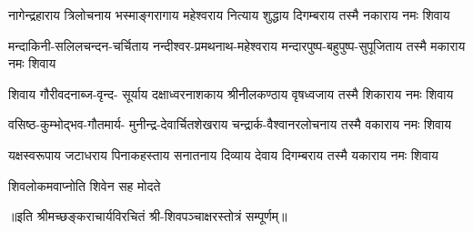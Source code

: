 

\fourlineindentedshloka
{नागेन्द्रहाराय त्रिलोचनाय}
{भस्माङ्गरागाय महेश्वराय}
{नित्याय शुद्धाय दिगम्बराय}
{तस्मै नकाराय नमः शिवाय}%

\fourlineindentedshloka
{मन्दाकिनी-सलिलचन्दन-चर्चिताय}
{नन्दीश्वर-प्रमथनाथ-महेश्वराय}
{मन्दारपुष्प-बहुपुष्प-सुपूजिताय}
{तस्मै मकाराय नमः शिवाय}%

\fourlineindentedshloka
{शिवाय गौरीवदनाब्ज-वृन्द-}
{सूर्याय दक्षाध्वरनाशकाय}
{श्रीनीलकण्ठाय वृषध्वजाय}
{तस्मै शिकाराय नमः शिवाय}%

\fourlineindentedshloka
{वसिष्ठ-कुम्भोद्भव-गौतमार्य-}
{मुनीन्द्र-देवार्चितशेखराय}
{चन्द्रार्क-वैश्वानरलोचनाय}
{तस्मै वकाराय नमः शिवाय}%

\fourlineindentedshloka
{यक्षस्वरूपाय जटाधराय}
{पिनाकहस्ताय सनातनाय}
{दिव्याय देवाय दिगम्बराय}
{तस्मै यकाराय नमः शिवाय}%

{शिवलोकमवाप्नोति शिवेन सह मोदते}

॥इति श्रीमच्छङ्कराचार्यविरचितं श्री-शिवपञ्चाक्षरस्तोत्रं सम्पूर्णम्॥